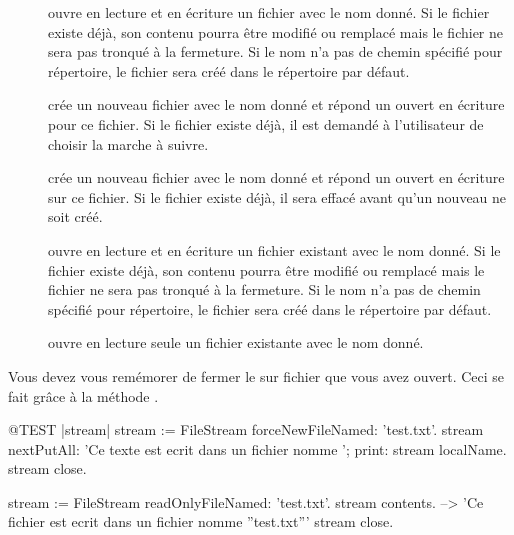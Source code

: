\documentclass[a4paper,10pt,twoside]{book}
\begin{document}
\begin{description}

\item[] ouvre en lecture et en \'ecriture un fichier 
  avec le nom donn\'e. Si le fichier existe d\'ej\`a, son contenu pourra
  \^etre modifi\'e ou remplac\'e mais le fichier ne sera pas tronqu\'e
  \`a la fermeture. Si le nom n'a pas de chemin sp\'ecifi\'e pour r\'epertoire,
  le fichier sera cr\'e\'e dans le r\'epertoire par d\'efaut.
  
\item[] cr\'ee un nouveau fichier avec le nom donn\'e
	et r\'epond un \stream ouvert en \'ecriture pour ce fichier.
	Si le fichier existe d\'ej\`a, il est demand\'e \`a l'utilisateur
	de choisir la marche \`a suivre.
  
\item[] cr\'ee un nouveau fichier avec le nom donn\'e
	et r\'epond un \stream ouvert en \'ecriture sur ce fichier.
	Si le fichier existe d\'ej\`a, il sera effac\'e avant qu'un nouveau
	ne soit cr\'e\'e.

\item[] ouvre en lecture et en \'ecriture un fichier 
	existant avec le nom donn\'e. Si le fichier existe d\'ej\`a, son 
	contenu pourra \^etre modifi\'e ou remplac\'e mais le fichier ne sera
	pas tronqu\'e \`a la fermeture. Si le nom n'a pas de chemin sp\'ecifi\'e
	pour r\'epertoire, le fichier sera cr\'e\'e dans le r\'epertoire par
	d\'efaut.

\item[] ouvre en lecture seule un fichier 
	existante avec le nom donn\'e.

\end{description}

Vous devez vous rem\'emorer de fermer le \stream sur fichier que vous avez ouvert. Ceci se fait gr\^ace \`a la m\'ethode .

\begin{code}{@TEST |stream|}
stream := FileStream forceNewFileNamed: 'test.txt'.
stream
    nextPutAll: 'Ce texte est ecrit dans un fichier nomme ';
    print: stream localName.
stream close.

stream := FileStream readOnlyFileNamed: 'test.txt'.
stream contents. --> 'Ce fichier est ecrit dans un fichier nomme ''test.txt'''
stream close.
\end{code}
\end{document}

